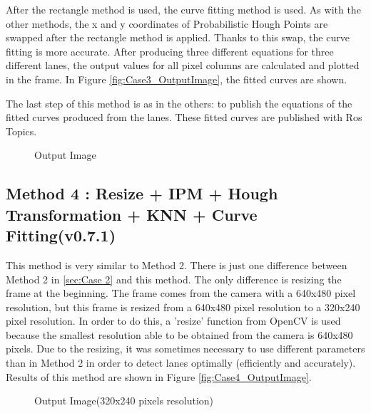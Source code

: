 After the rectangle method is used, the curve fitting method is used. As with the other methods, the x and y coordinates of Probabilistic Hough Points are swapped after the rectangle method is applied. Thanks to this swap, the curve fitting is more accurate. After producing three different equations for three different lanes, the output values for all pixel columns are calculated and plotted in the frame. In Figure \ref{fig:Case3_OutputImage}, the fitted curves are shown.

The last step of this method is as in the others: to publish the equations of the fitted curves produced from the lanes. These fitted curves are published with Ros Topics.

\begin{figure}[H]
  \centering
  \caption{Output Image}
\end{figure}

\subsection{Method 4 : Resize + IPM + Hough Transformation + KNN + Curve Fitting(v0.7.1)}\label{sec:Case 4}

This method is very similar to Method 2. There is just one difference between Method 2 in \ref{sec:Case 2} and this method. The only difference is resizing the frame at the beginning. The frame comes from the camera with a 640x480 pixel resolution, but this frame is resized from a 640x480 pixel resolution to a 320x240 pixel resolution. In order to do this, a 'resize' function from OpenCV is used because the smallest resolution able to be obtained from the camera is 640x480 pixels. Due to the resizing, it was sometimes necessary to use different parameters than in Method 2 in order to detect lanes optimally (efficiently and accurately). Results of this method are shown in Figure \ref{fig:Case4_OutputImage}.

\begin{figure}[H]
  \centering
  \caption{Output Image(320x240 pixels resolution)}
\end{figure}

%
